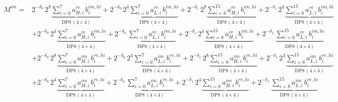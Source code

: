 \documentclass[fleqn]{article}
\newcommand{\DPop}[3]{\mathrm{DP#1}\,(#2\!\times\!#3)}
\begin{document}
\begin{align*}
M^{im} = {}
  & 2^{-\delta_0}\,2^{8}\underbrace{\sum_{i=0}^{7} a_{H,i}^{re}\, b_i^{im,hi}}_{\DPop{8}{4}{4}}
  + 2^{-\delta_0}\,2^{4}\underbrace{\sum_{i=0}^{7} a_{L,i}^{re}\, b_i^{im,hi}}_{\DPop{8}{4}{4}}
  + 2^{-\delta_1}\,2^{8}\underbrace{\sum_{i=8}^{15} a_{H,i}^{re}\, b_i^{im,hi}}_{\DPop{8}{4}{4}}
  + 2^{-\delta_1}\,2^{4}\underbrace{\sum_{i=8}^{15} a_{L,i}^{re}\, b_i^{im,hi}}_{\DPop{8}{4}{4}} \\[0.6em]
  & + 2^{-\delta_0}\,2^{4}\underbrace{\sum_{i=0}^{7} a_{H,i}^{re}\, b_i^{im,lo}}_{\DPop{8}{4}{4}}
  + 2^{-\delta_0}\,\underbrace{\sum_{i=0}^{7} a_{L,i}^{re}\, b_i^{im,lo}}_{\DPop{8}{4}{4}}
  + 2^{-\delta_1}\,2^{4}\underbrace{\sum_{i=8}^{15} a_{H,i}^{re}\, b_i^{im,lo}}_{\DPop{8}{4}{4}}
  + 2^{-\delta_1}\,\underbrace{\sum_{i=8}^{15} a_{L,i}^{re}\, b_i^{im,lo}}_{\DPop{8}{4}{4}} \\[0.6em]
  & + 2^{-\delta_0}\,2^{8}\underbrace{\sum_{i=0}^{7} a_{H,i}^{im}\, b_i^{re,hi}}_{\DPop{8}{4}{4}}
  + 2^{-\delta_0}\,2^{4}\underbrace{\sum_{i=0}^{7} a_{L,i}^{im}\, b_i^{re,hi}}_{\DPop{8}{4}{4}}
  + 2^{-\delta_1}\,2^{8}\underbrace{\sum_{i=8}^{15} a_{H,i}^{im}\, b_i^{re,hi}}_{\DPop{8}{4}{4}}
  + 2^{-\delta_1}\,2^{4}\underbrace{\sum_{i=8}^{15} a_{L,i}^{im}\, b_i^{re,hi}}_{\DPop{8}{4}{4}} \\[0.6em]
  & + 2^{-\delta_0}\,2^{4}\underbrace{\sum_{i=0}^{7} a_{H,i}^{im}\, b_i^{re,lo}}_{\DPop{8}{4}{4}}
  + 2^{-\delta_0}\,\underbrace{\sum_{i=0}^{7} a_{L,i}^{im}\, b_i^{re,lo}}_{\DPop{8}{4}{4}}
  + 2^{-\delta_1}\,2^{4}\underbrace{\sum_{i=8}^{15} a_{H,i}^{im}\, b_i^{re,lo}}_{\DPop{8}{4}{4}}
  + 2^{-\delta_1}\,\underbrace{\sum_{i=8}^{15} a_{L,i}^{im}\, b_i^{re,lo}}_{\DPop{8}{4}{4}}
\end{align*}
\end{document}
